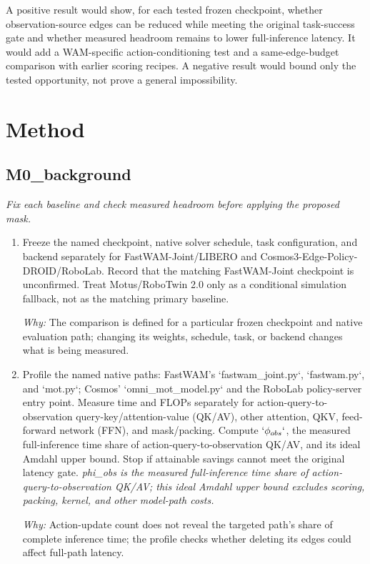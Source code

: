\documentclass[10pt,a4paper]{article}
\begin{document}
A positive result would show, for each tested frozen checkpoint, whether observation-source edges can be reduced while meeting the original task-success gate and whether measured headroom remains to lower full-inference latency. It would add a WAM-specific action-conditioning test and a same-edge-budget comparison with earlier scoring recipes. A negative result would bound only the tested opportunity, not prove a general impossibility.
\section*{Method}
\subsection*{M0\_background}
\emph{Fix each baseline and check measured headroom before applying the proposed mask.}
\begin{enumerate}[leftmargin=*,start=1]
  \item Freeze the named checkpoint, native solver schedule, task configuration, and backend separately for FastWAM-Joint/LIBERO and Cosmos3-Edge-Policy-DROID/RoboLab. Record that the matching FastWAM-Joint checkpoint is unconfirmed. Treat Motus/RoboTwin 2.0 only as a conditional simulation fallback, not as the matching primary baseline.
\par\emph{Why:} The comparison is defined for a particular frozen checkpoint and native evaluation path;\allowbreak{} changing its weights, schedule, task, or backend changes what is being measured.
  \item Profile the named native paths: FastWAM's `fastwam\_joint.py`, `fastwam.py`, and `mot.py`;\allowbreak{} Cosmos' `omni\_mot\_model.py` and the RoboLab policy-server entry point. Measure time and FLOPs separately for action-query-to-observation query-key/attention-value (QK/AV), other attention, QKV, feed-forward network (FFN), and mask/packing. Compute \(`\phi _{obs}`\), the measured full-inference time share of action-query-to-observation QK/AV, and its ideal Amdahl upper bound. Stop if attainable savings cannot meet the original latency gate.
\noindent\emph{phi\_obs is the measured full-inference time share of action-query-to-observation QK/AV;\allowbreak{} this ideal Amdahl upper bound excludes scoring, packing, kernel, and other model-path costs.}
\par{}
\par\emph{Why:} Action-update count does not reveal the targeted path's share of complete inference time;\allowbreak{} the profile checks whether deleting its edges could affect full-path latency.
\end{enumerate}
\end{document}
